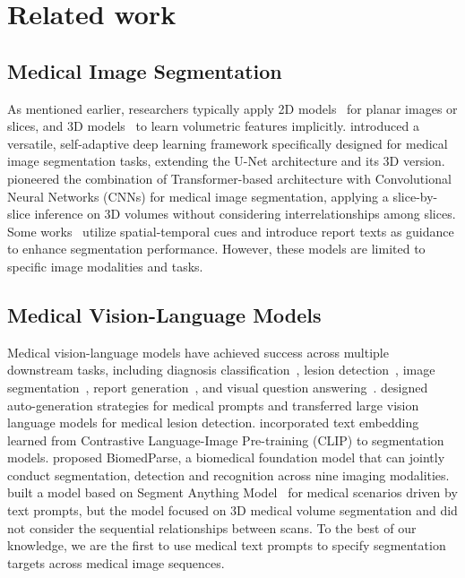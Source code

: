 \section{Related work}
\label{RL}

\subsection{Medical Image Segmentation} 
As mentioned earlier, researchers typically apply 2D models~\citep{ronneberger2015unet} for planar images or slices, and 3D models~\citep{cciccek20163dunet, milletari2016vnet} to learn volumetric features implicitly.
\citet{isensee2021nnunet} introduced a versatile, self-adaptive deep learning framework specifically designed for medical image segmentation tasks, extending the U-Net architecture and its 3D version. 
\citet{chen2021transunet} pioneered the combination of Transformer-based architecture with Convolutional Neural Networks (CNNs) for medical image segmentation, applying a slice-by-slice inference on 3D volumes without considering interrelationships among slices. 
Some works~\citep{ji2021pns, painchaud2022echocardiography, lin2023shifting} utilize spatial-temporal cues and \citep{li2023lvit,zhong2023ariadne,bui2024mmiunet} introduce report texts as guidance to enhance segmentation performance. However, these models are limited to specific image modalities and tasks.  

\subsection{Medical Vision-Language Models} Medical vision-language models have achieved success across multiple downstream tasks, including diagnosis classification~\citep{moon2022medvill, medclip, chexzero, lu2023mizero}, lesion detection~\citep{qin2023mvlm, huang2024adapting}, image segmentation~\citep{zhao2023one, li2023lvit}, report generation~\citep{yan2022clinical-bert, BioViL-T}, and visual question answering~\citep{singhal2023med-palm, moor2023med-flamingo}. 
\citet{qin2023mvlm} designed auto-generation strategies for medical prompts and transferred large vision language models for medical lesion detection. 
\citet{liu2023clip-driven} incorporated text embedding learned from Contrastive Language-Image Pre-training (CLIP) to segmentation models.
\citet{zhao2024biomedparse} proposed BiomedParse, a biomedical foundation model that can jointly conduct segmentation, detection and recognition across nine imaging modalities.
\citet{zhao2023one} built a model based on Segment Anything Model~\citep{kirillov2023sam} for medical scenarios driven by text prompts, but the model focused on 3D medical volume segmentation and did not consider the sequential relationships between scans. 
To the best of our knowledge, we are the first to use medical text prompts to specify segmentation targets across medical image sequences.

